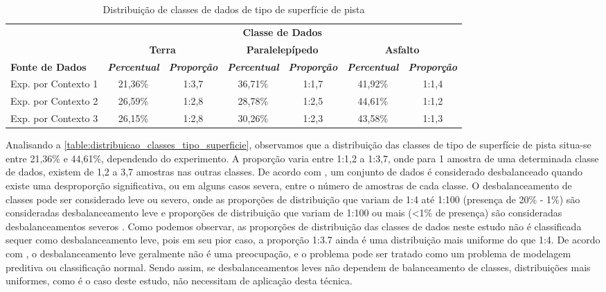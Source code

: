 \begin{table}[h]
\caption{Distribuição de classes de dados de tipo de superfície de pista}
\label{table:distribuicao_classes_tipo_superficie}
\centering
\scriptsize
\begin{tabular}{lcccccc}
\cmidrule(l){2-7}
\multicolumn{1}{c}{\multirow{2}{*}{\textbf{}}} & 
\multicolumn{6}{c}{\textbf{Classe de Dados}} \\ \cmidrule(l){2-7} 
\multicolumn{1}{c}{} & 
\multicolumn{2}{c}{\textbf{Terra}} & 
\multicolumn{2}{c}{\textbf{Paralelepípedo}} & 
\multicolumn{2}{c}{\textbf{Asfalto}} \\ \midrule
\textbf{Fonte de Dados} & 
\textit{\textbf{Percentual}} & 
\textit{\textbf{Proporção}} & 
\textit{\textbf{Percentual}} & 
\textit{\textbf{Proporção}} & 
\textit{\textbf{Percentual}} & 
\textit{\textbf{Proporção}} \\ \midrule
Exp. por Contexto 1 & 21,36\% & 1:3,7 & 36,71\% & 1:1,7 & 41,92\% & 1:1,4 \\ \midrule
Exp. por Contexto 2 & 26,59\% & 1:2,8 & 28,78\% & 1:2,5 & 44,61\% & 1:1,2 \\ \midrule
Exp. por Contexto 3 & 26,15\% & 1:2,8 & 30,26\% & 1:2,3 & 43,58\% & 1:1,3 \\ \bottomrule
\end{tabular}
\end{table}

Analisando a \autoref{table:distribuicao_classes_tipo_superficie}, observamos que a distribuição das classes de tipo de superfície de pista situa-se entre 21,36\% e 44,61\%, dependendo do experimento. A proporção varia entre 1:1,2 a 1:3,7, onde para 1 amostra de uma determinada classe de dados, existem de 1,2 a 3,7 amostras nas outras classes. De acordo com \cite{Fernandez2018}, um conjunto de dados é considerado desbalanceado quando existe uma desproporção significativa, ou em alguns casos severa, entre o número de amostras de cada classe. O desbalanceamento de classes pode ser considerado leve ou severo, onde as proporções de distribuição que variam de 1:4 até 1:100 (presença de 20\% - 1\%) são consideradas desbalanceamento leve e proporções de distribuição que variam de 1:100 ou mais (<1\% de presença) são consideradas desbalanceamentos severos \cite{Krawczyk2016,Brownlee2020}. Como podemos observar, as proporções de distribuição das classes de dados neste estudo não é classificada sequer como desbalanceamento leve, pois em seu pior caso, a proporção 1:3.7 ainda é uma distribuição mais uniforme do que 1:4. De acordo com \cite{Brownlee2020}, o desbalanceamento leve geralmente não é uma preocupação, e o problema pode ser tratado como um problema de modelagem preditiva ou classificação normal. Sendo assim, se desbalanceamentos leves não dependem de balanceamento de classes, distribuições mais uniformes, como é o caso deste estudo, não necessitam de aplicação desta técnica. 


